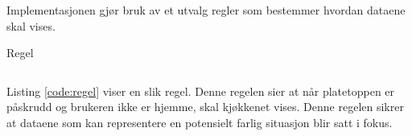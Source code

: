Implementasjonen gjør bruk av et utvalg regler som bestemmer hvordan dataene skal vises.\begin{listing}[ht]
\caption{Regel}
\inputminted[fontsize=\footnotesize, linenos]{clj}{kodesnutter/rule.clj}
\label{code:regel}
\end{listing} Listing \ref{code:regel} viser en slik regel. Denne regelen sier at når platetoppen er påskrudd og brukeren ikke er hjemme, skal kjøkkenet vises. Denne regelen sikrer at dataene som kan representere en potensielt farlig situasjon blir satt i fokus.









